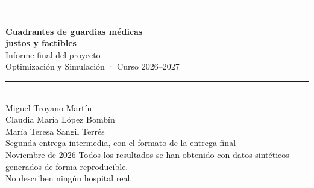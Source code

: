 \documentclass[10pt,a4paper]{article}
\begin{document}
\hypersetup{pageanchor=false}
\begin{titlepage}
\centering
\vspace*{3cm}
{\color{navy}\rule{\linewidth}{1.2pt}}\\[14pt]
{\Huge\bfseries\color{navy} Cuadrantes de guardias médicas\\[6pt] justos y factibles}\\[14pt]
{\Large Informe final del proyecto}\\[4pt]
{\large Optimización y Simulación · Curso 2026--2027}\\[10pt]
{\color{navy}\rule{\linewidth}{1.2pt}}\\[2cm]
{\large Miguel Troyano Martín\\[2pt] Claudia María López Bombín\\[2pt] María Teresa Sangil Terrés}\\[2cm]
{\large Segunda entrega intermedia, con el formato de la entrega final}\\[4pt]
{\large Noviembre de 2026}
\vfill
{\small Todos los resultados se han obtenido con datos sintéticos generados de forma reproducible.\\ No describen ningún hospital real.}
\end{titlepage}
\hypersetup{pageanchor=true}



\tableofcontents
\newpage




\end{document}
